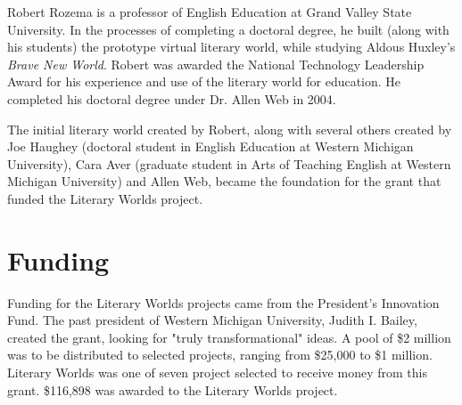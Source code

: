 \documentclass[12pt, letterpaper]{report}
\begin{document}
\par
Robert Rozema is a professor of English Education at Grand Valley State University.  In the processes of completing a doctoral degree, he built (along with his students) the prototype virtual literary world, while studying Aldous Huxley's \textit{Brave New World}. Robert was awarded the National Technology Leadership Award for his experience and use of the literary world for education.  He completed his doctoral degree under Dr. Allen Web in 2004.

\par
The initial literary world created by Robert, along with several others created by Joe Haughey (doctoral student in English Education at Western Michigan University), Cara Aver (graduate student in Arts of Teaching English at Western Michigan University) and Allen Web, became the foundation for the grant that funded the Literary Worlds project. \cite{VirtWorldsTech}

\section{Funding}
\par
Funding for the Literary Worlds projects came from the President's Innovation Fund.  The past president of Western Michigan University, Judith I. Bailey, created the grant, looking for "truly transformational" ideas. A pool of \$2 million was to be distributed to selected projects, ranging from \$25,000 to \$1 million. Literary Worlds was one of seven project selected to receive money from this grant. \$116,898 was awarded to the Literary Worlds project. \cite{VirtWorldsTech}
\end{document}
